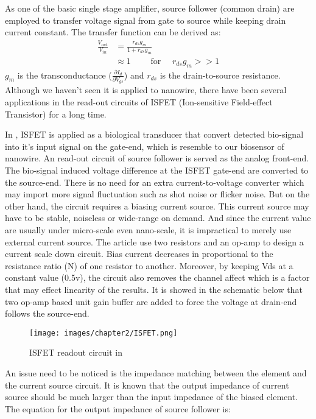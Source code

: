 As one of the basic single stage amplifier, source follower (common drain) are employed to transfer voltage signal from gate to source while keeping drain current constant.
The transfer function can be derived as:
\setlength{\mathindent}{5.5cm}
\begin{align}
    \frac{V_{out}}{V_{in}} & = \frac{r_{ds}g_m}{1 + r_{ds}g_m} \\    \label{eq:sfTF}
                           & \approx 1 \qquad \text{ for } \quad r_{ds}g_m >> 1
\end{align}
$g_m$ is the transconductance ($\frac{\partial I_d}{\partial V_{gs}}$) and $r_{ds}$ is the drain-to-source resistance.
Although we haven't seen it is applied to nanowire, there have been several applications in the read-out circuits of ISFET (Ion-sensitive Field-effect Transistor)\cite{SF1, SF2} for a long time.



In \cite{SF1}, ISFET is applied as a biological transducer that convert detected bio-signal into it's input signal on the gate-end, which is resemble to our biosensor of nanowire.
An read-out circuit of source follower is served as the analog front-end.
The bio-signal induced voltage difference at the ISFET gate-end are converted to the source-end.
There is no need for an extra current-to-voltage converter which may import more signal fluctuation such as shot noise or flicker noise.
But on the other hand, the circuit requires a biasing current source.
This current source may have to be stable, noiseless or wide-range on demand.
And since the current value are usually under micro-scale even nano-scale, it is impractical to merely use external current source.
The article use two resistors and an op-amp to design a current scale down circuit.
Bias current decreases in proportional to the resistance ratio (N) of one resistor to another.
Moreover, by keeping Vds at a constant value (0.5v), the circuit also removes {\color{red}the channel affect which is a factor that may effect linearity of the results.}
It is showed in the schematic below that two op-amp based unit gain buffer are added to force the voltage at drain-end follows the source-end.

\begin{figure}[h]
    \centering
    \texttt{[image: images/chapter2/ISFET.png]}
    \fontsize{6}{7}\selectfont
    \caption{ISFET readout circuit in \cite{SF1}}
    \label{fig:ISFET}
\end{figure}

An issue need to be noticed is the impedance matching between the element and the current source circuit.
It is known that the output impedance of current source should be much larger than the input impedance of the biased element.
The equation for the output impedance of source follower is:

